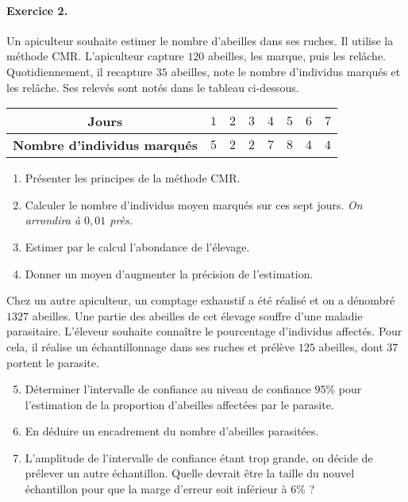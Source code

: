 \documentclass[11pt]{article}
\begin{document}
\paragraph{Exercice 2.} Un apiculteur souhaite estimer le nombre d'abeilles dans
ses ruches. Il utilise la méthode CMR. L'apiculteur capture $120$ abeilles, les
marque, puis les rel\^ache. Quotidiennement, il recapture $35$ abeilles, note le
nombre d'individus marqués et les rel\^ache. Ses relevés sont notés dans le
tableau ci-dessous.
\begin{center}
  \renewcommand{\arraystretch}{1.2}
  \begin{tabular}[]{|c|c|c|c|c|c|c|c|}
    \hline
    \textbf{Jours} & $1$ & $2$ & $3$ & $4$ & $5$ & $6$ & $7$ \\
    \hline
    \textbf{Nombre d'individus marqués} & $5$ & $2$ & $2$ & $7$ & $8$ & $4$ &
    $4$ \\
    \hline
  \end{tabular}
\end{center}
\begin{enumerate}
  \item Présenter les principes de la méthode CMR.
  \item Calculer le nombre d'individus moyen marqués sur ces sept jours.
    \emph{On arrondira à $0,01$ près.}
  \item Estimer par le calcul l'abondance de l'élevage.
  \item Donner un moyen d'augmenter la précision de l'estimation.
\end{enumerate}
Chez un autre apiculteur, un comptage exhaustif a été réalisé et on a dénombré
$1327$ abeilles. Une partie des abeilles de cet élevage souffre d'une maladie
parasitaire. L'éleveur souhaite connaître le pourcentage d'individus affectés.
Pour cela, il réalise un échantillonnage dans ses ruches et prélève $125$
abeilles, dont $37$ portent le parasite.
\begin{enumerate}
    \setcounter{enumi}{4}
  \item Déterminer l'intervalle de confiance au niveau de confiance $95$\% pour
    l'estimation de la proportion d'abeilles affectées par le parasite.
  \item En déduire un encadrement du nombre d'abeilles parasitées.
  \item L'amplitude de l'intervalle de confiance étant trop grande, on décide de prélever un
    autre échantillon. Quelle devrait être la taille du nouvel échantillon pour
    que la marge d'erreur soit inférieur à $6$\% ?
\end{enumerate}
\end{document}
